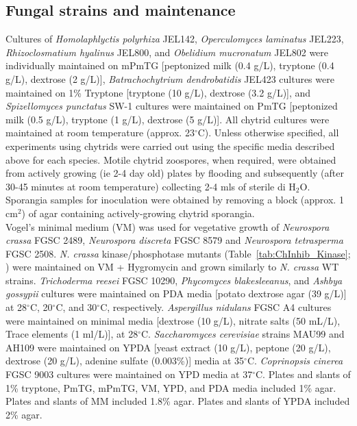 \subsection*{Fungal strains and maintenance}
Cultures of \textit{Homolaphlyctis polyrhiza} JEL142, \textit{Operculomyces laminatus} JEL223, \textit{Rhizoclosmatium hyalinus} JEL800, and \textit{Obelidium mucronatum} JEL802 were individually maintained on mPmTG [peptonized milk (0.4 g/L), tryptone (0.4 g/L), dextrose (2 g/L)], \textit{Batrachochytrium dendrobatidis} JEL423 cultures were maintained on 1\% Tryptone [tryptone (10 g/L), dextrose (3.2 g/L)], and \textit{Spizellomyces punctatus} SW-1 cultures were maintained on PmTG [peptonized milk (0.5 g/L), tryptone (1 g/L), dextrose (5 g/L)]. All chytrid cultures were maintained at room temperature (approx. 23$^{\circ}$C). Unless otherwise specified, all experiments using chytrids were carried out using the specific media described above for each species. Motile chytrid zoospores, when required, were obtained from actively growing (ie 2-4 day old) plates by flooding and subsequently (after 30-45 minutes at room temperature) collecting 2-4 mls of sterile di H$_{2}$O. Sporangia samples for inoculation were obtained by removing a block (approx. 1 cm$^{2}$) of agar containing actively-growing chytrid sporangia.\\
\indent Vogel's minimal medium (VM) \cite{Davis1970} was used for vegetative growth of \textit{Neurospora crassa} FGSC 2489, \textit{Neurospora discreta} FGSC 8579 and \textit{Neurospora tetrasperma} FGSC 2508. \textit{N. crassa} kinase/phosphotase mutants (Table~\ref{tab:ChInhib_Kinase}; \cite{Park2011}) were maintained on VM + Hygromycin and grown similarly to \textit{N. crassa} WT strains. \textit{Trichoderma reesei} FGSC 10290, \textit{Phycomyces blakesleeanus}, and \textit{Ashbya gossypii} cultures were maintained on PDA media [potato dextrose agar (39 g/L)] at 28$^{\circ}$C, 20$^{\circ}$C, and 30$^{\circ}$C, respectively. \textit{Aspergillus nidulans} FGSC A4 cultures were maintained on minimal media [dextrose (10 g/L), nitrate salts (50 mL/L), Trace elements (1 ml/L)], at 28$^{\circ}$C. \textit{Saccharomyces cerevisiae} strains MAU99 and AH109 were maintained on YPDA [yeast extract (10 g/L), peptone (20 g/L), dextrose (20 g/L), adenine sulfate (0.003\%)] media at 35$^{\circ}$C. \textit{Coprinopsis cinerea} FGSC 9003 cultures were maintained on YPD media at 37$^{\circ}$C.  Plates and slants of 1\% tryptone, PmTG, mPmTG, VM, YPD, and PDA media included 1\% agar. Plates and slants of MM included 1.8\% agar. Plates and slants of YPDA included 2\% agar.\\

